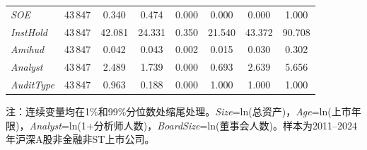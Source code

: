 \documentclass[11pt,a4paper]{article}
\begin{document}
\begin{table}[htbp]
\begin{tabular}{l*{7}{c}}
\textit{SOE}         & 43\,847 & 0.340 & 0.474 & 0.000 & 0.000 & 0.000 & 1.000 \\
\textit{InstHold}    & 43\,847 & 42.081 & 24.331 & 0.350 & 21.540 & 43.372 & 90.708 \\
\textit{Amihud}      & 43\,847 & 0.042 & 0.043 & 0.002 & 0.015 & 0.030 & 0.302 \\
\textit{Analyst}     & 43\,847 & 2.489 & 1.739 & 0.000 & 0.693 & 2.639 & 5.656 \\
\textit{AuditType}   & 43\,847 & 0.963 & 0.188 & 0.000 & 1.000 & 1.000 & 1.000 \\
\bottomrule
\end{tabular}

\vspace{4pt}
{\footnotesize 注：连续变量均在1\%和99\%分位数处缩尾处理。\textit{Size}=ln(总资产)，\textit{Age}=ln(上市年限)，\textit{Analyst}=ln(1+分析师人数)，\textit{BoardSize}=ln(董事会人数)。样本为2011--2024年沪深A股非金融非ST上市公司。}
\end{table}


\FloatBarrier
\end{document}
